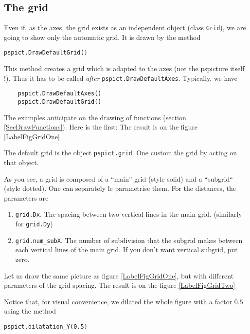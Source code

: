 \subsection{The grid}

Even if, as the axes, the grid exists as an independent object (class \verb+Grid+), we are going to show only the automatic grid. It is drawn by the method 
\begin{verbatim}
pspict.DrawDefaultGrid()
\end{verbatim}
This method creates a grid which is adapted to the axes (not the pspicture itself !). Thus it has to be called \emph{after} \verb+pspict.DrawDefaultAxes+. Typically, we have
\begin{verbatim}
	pspict.DrawDefaultAxes()
	pspict.DrawDefaultGrid()
\end{verbatim}
The examples anticipate on the drawing of functions (section \ref{SecDrawFunctions}). Here is the first:
The result is on the figure \ref{LabelFigGridOne}
\newcommand{\CaptionFigGridOne}{A function, a grid and the axes with the default settings.}

The default grid is the object \verb+pspict.grid+. One custom the grid by acting on that object.

As you see, a grid is composed of a ``main'' grid (style solid) and a ``subgrid`` (style dotted). One can separately le parametrise them. For the distances, the parameters are
\begin{enumerate}
		\item \verb+grid.Dx+. 
			The spacing between two vertical lines in the main grid. (similarly for \verb+grid.Dy+)
		\item \verb+grid.num_subX+.
			The number of subdivision that the subgrid makes between each vertical lines of the main grid. If you don't want vertical subgrid, put zero.
\end{enumerate}
Let us draw the same picture as figure \ref{LabelFigGridOne}, but with different parameters of the grid spacing.
The result is on the figure \ref{LabelFigGridTwo}
\newcommand{\CaptionFigGridTwo}{Grid with customized spacing.}

Notice that, for visual convenience, we dilated the whole figure with a factor $0.5$ using the method
\begin{verbatim}
pspict.dilatation_Y(0.5)
\end{verbatim}

